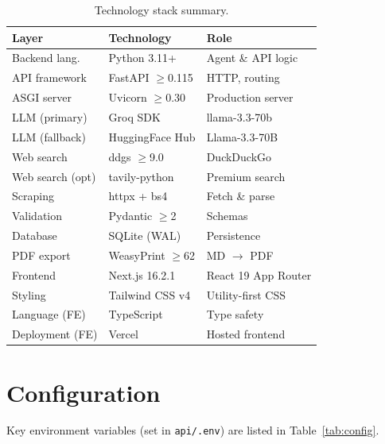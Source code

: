 \documentclass[10pt, twocolumn]{article}
\begin{document}
\begin{table}[H]
  \centering
  \small
  \caption{Technology stack summary.}
  \label{tab:stack}
  \begin{tabular}{p{1.8cm} p{2.0cm} p{2.2cm}}
    \toprule
    \textbf{Layer} & \textbf{Technology} & \textbf{Role} \\
    \midrule
    Backend lang.    & Python 3.11+      & Agent \& API logic \\
    API framework    & FastAPI $\geq$0.115 & HTTP, routing \\
    ASGI server      & Uvicorn $\geq$0.30 & Production server \\
    LLM (primary)    & Groq SDK          & llama-3.3-70b \\
    LLM (fallback)   & HuggingFace Hub   & Llama-3.3-70B \\
    Web search       & ddgs $\geq$9.0    & DuckDuckGo \\
    Web search (opt) & tavily-python     & Premium search \\
    Scraping         & httpx + bs4       & Fetch \& parse \\
    Validation       & Pydantic $\geq$2  & Schemas \\
    Database         & SQLite (WAL)      & Persistence \\
    PDF export       & WeasyPrint $\geq$62 & MD $\to$ PDF \\
    Frontend         & Next.js 16.2.1    & React 19 App Router \\
    Styling          & Tailwind CSS v4   & Utility-first CSS \\
    Language (FE)    & TypeScript        & Type safety \\
    Deployment (FE)  & Vercel            & Hosted frontend \\
    \bottomrule
  \end{tabular}
\end{table}

\section{Configuration}

Key environment variables (set in \texttt{api/.env}) are listed in
Table~\ref{tab:config}.
\end{document}
